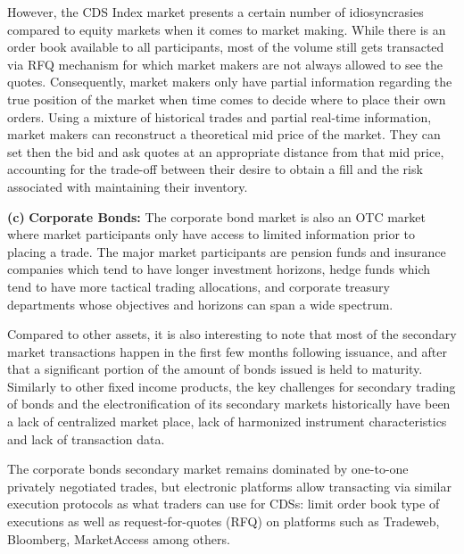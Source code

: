 However, the CDS Index market presents a certain number of idiosyncrasies compared to equity markets when it comes to market making. While there is an order book available to all participants, most of the volume still gets transacted via RFQ mechanism for which market makers are not always allowed to see the quotes. Consequently, market makers only have partial information regarding the true position of the market when time comes to decide where to place their own orders. Using a mixture of historical trades and partial real-time information, market makers can reconstruct a theoretical mid price of the market. They can set then the bid and ask quotes at an appropriate distance from that mid price, accounting for the trade-off between their desire to obtain a fill and the risk associated with maintaining their inventory. \twomedskip


\noindent\textbf{(c)} \textbf{Corporate Bonds:} The corporate bond market is also an OTC market where market participants only have access to limited information prior to placing a trade. The major market participants are pension funds and insurance companies which tend to have longer investment horizons, hedge funds which tend to have more tactical trading allocations, and corporate treasury departments whose objectives and horizons can span a wide spectrum.


Compared to other assets, it is also interesting to note that most of the secondary market transactions happen in the first few months following issuance, and after that a significant portion of the amount of bonds issued is held to maturity. Similarly to other fixed income products, the key challenges for secondary trading of bonds and the electronification of its secondary markets historically have been a lack of centralized market place, lack of harmonized instrument characteristics and lack of transaction data.


The corporate bonds secondary market remains dominated by one-to-one privately negotiated trades, but electronic platforms allow transacting via similar execution protocols as what traders can use for CDSs: limit order book type of executions as well as request-for-quotes (RFQ) on platforms such as Tradeweb, Bloomberg, MarketAccess among others.


